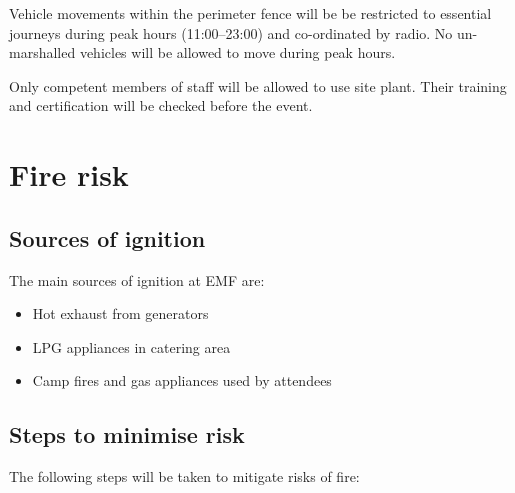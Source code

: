 Vehicle movements within the perimeter fence will be be restricted to essential journeys during peak hours (11:00--23:00) and co-ordinated by radio. No un-marshalled vehicles will be allowed to move during peak hours.

Only competent members of staff will be allowed to use site plant. Their training and certification will be checked before the event.

\section{Fire risk}
\subsection{Sources of ignition}

The main sources of ignition at EMF are:

\begin{itemize}
\item Hot exhaust from generators
\item LPG appliances in catering area
\item Camp fires and gas appliances used by attendees
\end{itemize}

\subsection{Steps to minimise risk}
The following steps will be taken to mitigate risks of fire:

